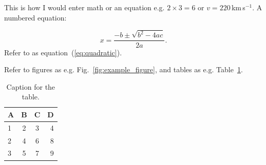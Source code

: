 \documentclass[fleqn,usenatbib]{mnras}
\begin{document}
This is how I would enter math or an equation e.g. $2\times3=6$
or $v=220$\,km\,s$^{-1}$. A numbered equation:

\begin{equation}
    x=\frac{-b\pm\sqrt{b^2-4ac}}{2a}.
	\label{eq:quadratic}
\end{equation}
Refer to as equation~(\ref{eq:quadratic}).

Refer to figures as e.g. Fig.~\ref{fig:example_figure}, and tables as
e.g. Table~\ref{tab:example_table}.

\begin{table}
	\centering
	\caption{Caption for the table.}
	\label{tab:example_table}
	\begin{tabular}{lccr} %
		\hline
		A & B & C & D\\
		\hline
		1 & 2 & 3 & 4\\
		2 & 4 & 6 & 8\\
		3 & 5 & 7 & 9\\
		\hline
	\end{tabular}
\end{table}
\end{document}
